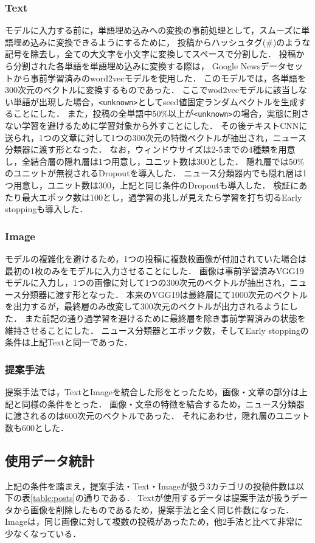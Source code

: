 \subsubsection{Text}
モデルに入力する前に，単語埋め込みへの変換の事前処理として，スムーズに単語埋め込みに変換できるようにするために，
投稿からハッシュタグ(\#)のような記号を除去し，全ての大文字を小文字に変換してスペースで分割した．
投稿から分割された各単語を単語埋め込みに変換する際は，
Google Newsデータセットから事前学習済みのword2vecモデル\cite{google_2013}を使用した．
このモデルでは，各単語を300次元のベクトルに変換するものであった．
ここでwod2vecモデルに該当しない単語が出現した場合，\texttt{<unknown>}としてseed値固定ランダムベクトルを生成することにした．
また，投稿の全単語中50\%以上が\texttt{<unknown>}の場合，実態に則さない学習を避けるために学習対象から外すことにした．
その後テキストCNNに送られ，1つの文章に対して1つの300次元の特徴ベクトルが抽出され，ニュース分類器に渡す形となった．
なお，ウィンドウサイズは2-5までの4種類を用意し，全結合層の隠れ層は1つ用意し，ユニット数は300とした．
隠れ層では50\%のユニットが無視されるDropoutを導入した．
ニュース分類器内でも隠れ層は1つ用意し，ユニット数は300，上記と同じ条件のDropoutも導入した．
検証にあたり最大エポック数は100とし，過学習の兆しが見えたら学習を打ち切るEarly stoppingも導入した．
%
\subsubsection{Image}
モデルの複雑化を避けるため，1つの投稿に複数枚画像が付加されていた場合は最初の1枚のみをモデルに入力させることにした．
画像は事前学習済みVGG19モデルに入力し，1つの画像に対して1つの300次元のベクトルが抽出され，ニュース分類器に渡す形となった．
本来のVGG19は最終層にて1000次元のベクトルを出力するが，最終層のみ改変して300次元のベクトルが出力されるようにした．
また前記の通り過学習を避けるために最終層を除き事前学習済みの状態を維持させることにした．
ニュース分類器とエポック数，そしてEarly stoppingの条件は上記Textと同一であった．
%
\subsubsection{提案手法}
提案手法では，TextとImageを統合した形をとったため，画像・文章の部分は上記と同様の条件をとった．
画像・文章の特徴を結合するため，ニュース分類器に渡されるのは600次元のベクトルであった．
それにあわせ，隠れ層のユニット数も600とした．
%
\subsection{使用データ統計}
上記の条件を踏まえ，提案手法・Text・Imageが扱う3カテゴリの投稿件数は以下の表\ref{table:posts}の通りである．
Textが使用するデータは提案手法が扱うデータから画像を削除したものであるため，提案手法と全く同じ件数になった．
Imageは，同じ画像に対して複数の投稿があったため，他2手法と比べて非常に少なくなっている．

